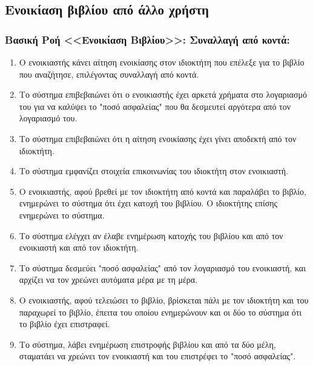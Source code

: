 \documentclass[12pt,a4paper]{article}
\begin{document}
\subsection{Ενοικίαση βιβλίου από άλλο χρήστη}

\subsubsection*{Βασική Ροή <<Ενοικίαση Βιβλίου>>: Συναλλαγή από κοντά:}
\begin{enumerate}
    \item Ο ενοικιαστής κάνει αίτηση ενοικίασης στον ιδιοκτήτη που επέλεξε για το βιβλίο που αναζήτησε, επιλέγοντας συναλλαγή από κοντά.
        \label{Επιλογή τρόπου συναλλαγής}
    \item Το σύστημα επιβεβαιώνει ότι ο ενοικιαστής έχει αρκετά χρήματα στο λογαριασμό του για να καλύψει το "ποσό ασφαλείας" που θα δεσμευτεί αργότερα από τον λογαριασμό του.
        \label{Έλεγχος ποσού ασφαλείας}
    \item Το σύστημα επιβεβαιώνει ότι η αίτηση ενοικίασης έχει γίνει αποδεκτή από τον ιδιοκτήτη.
        \label{Αποδοχή ή απόρριψη συναλλαγής}
    \item Το σύστημα εμφανίζει στοιχεία επικοινωνίας του ιδιοκτήτη στον ενοικιαστή.
    \item Ο ενοικιαστής, αφού βρεθεί με τον ιδιοκτήτη από κοντά και παραλάβει το βιβλίο, ενημερώνει το σύστημα ότι έχει κατοχή του βιβλίου. Ο ιδιοκτήτης επίσης ενημερώνει το σύστημα.
    \item Το σύστημα ελέγχει αν έλαβε ενημέρωση κατοχής του βιβλίου και από τον ενοικιαστή και από τον ιδιοκτήτη.
        \label {Δεν ενημερώνεται η κατοχή}
    \item Το σύστημα δεσμεύει "ποσό ασφαλείας" από τον λογαριασμό του ενοικιαστή, και αρχίζει να τον χρεώνει αυτόματα μέρα με τη μέρα.
        \label{Τέλος dispute resolved - Τέλος χρημάτων}
    \item Ο ενοικιαστής, αφού τελειώσει το βιβλίο, βρίσκεται πάλι με τον ιδιοκτήτη και του παραχωρεί το βιβλίο, έπειτα του οποίου ενημερώνουν και οι δύο το σύστημα ότι το βιβλίο έχει επιστραφεί.
        \label{Επιστροφή βιβλίου - Τέλος λεφτά δεν φτάνουν}
    \item Το σύστημα, λάβει ενημέρωση επιστροφής βιβλίου και από τα δύο μέλη, σταματάει να χρεώνει τον ενοικιαστή και του επιστρέφει το "ποσό ασφαλείας".
        \label{Τέλος ενοικίασης}
\end{enumerate}
\end{document}
